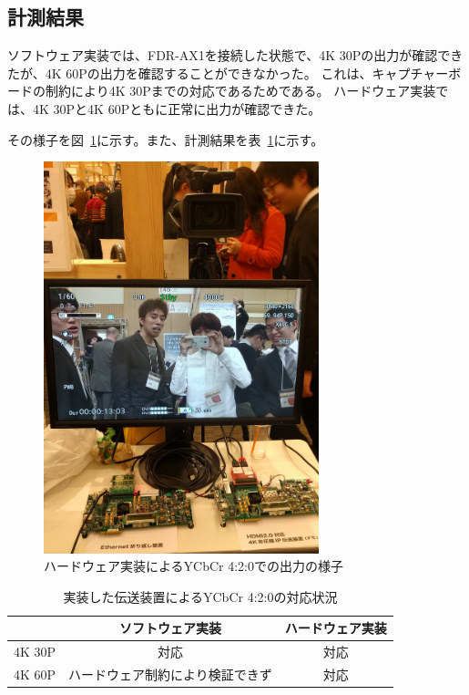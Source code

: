 \subsection{計測結果}
ソフトウェア実装では、FDR-AX1を接続した状態で、4K 30Pの出力が確認できたが、4K 60Pの出力を確認することができなかった。
これは、キャプチャーボードの制約により4K 30Pまでの対応であるためである。
ハードウェア実装では、4K 30Pと4K 60Pともに正常に出力が確認できた。

その様子を図~\ref{fig:orf2016}に示す。また、計測結果を表~\ref{tb:ycbcr-compatible}に示す。

\begin{figure}[htbp]
  \begin{center}
    \includegraphics[bb=0 0 1200 1703,width=8cm]{img/orf2016.png}
  \end{center}
  \caption{ハードウェア実装によるYCbCr 4:2:0での出力の様子}
  \label{fig:orf2016}
\end{figure}

\begin{table}[htbp]
  \caption{実装した伝送装置によるYCbCr 4:2:0の対応状況}
  \label{tb:ycbcr-compatible}
  \begin{center}
  \begin{tabular}{c|c|c}
    \hline
            & ソフトウェア実装 & ハードウェア実装 \\\hline\hline
     4K 30P & 対応 & 対応 \\\hline
     4K 60P & ハードウェア制約により検証できず & 対応 \\\hline
  \end{tabular}\end{center}
\end{table}

